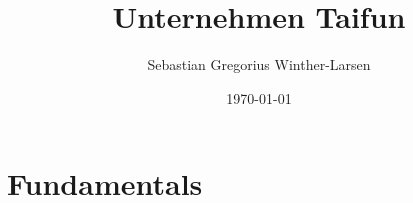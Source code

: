 \documentclass[twoside, english, notitlepage, 10pt]{uiofysmaster}
\author{Sebastian Gregorius Winther-Larsen}
\title{Unternehmen Taifun}
\date{\today}
\begin{document}
\frontmatter
    \maketitle

    \tableofcontents

\mainmatter

    \part{Fundamentals}

        
    
\end{document}
